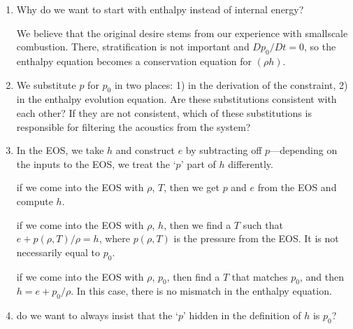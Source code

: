\begin{enumerate}
\item Why do we want to start with enthalpy instead of internal energy?

   We believe that the original desire stems from our experience with smallscale 
   combustion.  There, stratification is not important and $Dp_0/Dt = 0$, so
   the enthalpy equation becomes a conservation equation for $(\rho h)$.

\item We substitute $p$ for $p_0$ in two places: 1) in the derivation of the
constraint, 2) in the enthalpy evolution equation.   Are these substitutions
consistent with each other?  If they are not consistent, which of these 
substitutions is responsible for filtering the acoustics from the system?

\item In the EOS, we take $h$ and construct $e$ by subtracting off
  $p$---depending on the inputs to the EOS, we treat the `$p$' part of $h$
  differently.

   if we come into the EOS with $\rho$, $T$, then we get $p$ and $e$ from
   the EOS and compute $h$.

   if we come into the EOS with $\rho$, $h$, then we find a $T$ such that
   $e + p(\rho,T)/\rho = h$, where $p(\rho,T)$ is the pressure from the EOS.
   It is not necessarily equal to $p_0$.

   if we come into the EOS with $\rho$, $p_0$, then find a $T$ that matches
   $p_0$, and then $h = e + p_0/\rho$.  In this case, there is no mismatch
   in the enthalpy equation.


\item do we want to always insist that the `$p$' hidden in the definition of
   $h$ is $p_0$?

\end{enumerate}






